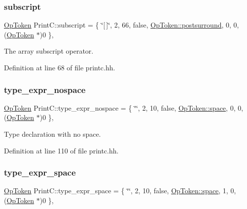 \subsubsection{\texorpdfstring{subscript}{subscript}}
{\footnotesize\ttfamily \mbox{\hyperlink{class_op_token}{Op\+Token}} Print\+C\+::subscript = \{ \char`\"{}\mbox{[}$\,$\mbox{]}\char`\"{}, 2, 66, false, \mbox{\hyperlink{class_op_token_af41c7f108d5662ede7765c5a6c44eaffa82a30068870b08542e958e828d6464fa}{Op\+Token\+::postsurround}}, 0, 0, (\mbox{\hyperlink{class_op_token}{Op\+Token}} $\ast$)0 \}\hspace{0.3cm}{\ttfamily [static]}, {\ttfamily [protected]}}



The array subscript operator. 



Definition at line 68 of file printc.\+hh.

\mbox{\label{class_print_c_afb18c444eb771f284d723e780dd5521b}} 
\subsubsection{\texorpdfstring{type\_expr\_nospace}{type\_expr\_nospace}}
{\footnotesize\ttfamily \mbox{\hyperlink{class_op_token}{Op\+Token}} Print\+C\+::type\+\_\+expr\+\_\+nospace = \{ \char`\"{}\char`\"{}, 2, 10, false, \mbox{\hyperlink{class_op_token_af41c7f108d5662ede7765c5a6c44eaffa07bc235399849635f28ca7caaaebb1a4}{Op\+Token\+::space}}, 0, 0, (\mbox{\hyperlink{class_op_token}{Op\+Token}} $\ast$)0 \}\hspace{0.3cm}{\ttfamily [static]}, {\ttfamily [protected]}}



Type declaration with no space. 



Definition at line 110 of file printc.\+hh.

\mbox{\label{class_print_c_a2f5109e6fdfdf2ab4d6b30749a2311a2}} 
\subsubsection{\texorpdfstring{type\_expr\_space}{type\_expr\_space}}
{\footnotesize\ttfamily \mbox{\hyperlink{class_op_token}{Op\+Token}} Print\+C\+::type\+\_\+expr\+\_\+space = \{ \char`\"{}\char`\"{}, 2, 10, false, \mbox{\hyperlink{class_op_token_af41c7f108d5662ede7765c5a6c44eaffa07bc235399849635f28ca7caaaebb1a4}{Op\+Token\+::space}}, 1, 0, (\mbox{\hyperlink{class_op_token}{Op\+Token}} $\ast$)0 \}\hspace{0.3cm}{\ttfamily [static]}, {\ttfamily [protected]}}



